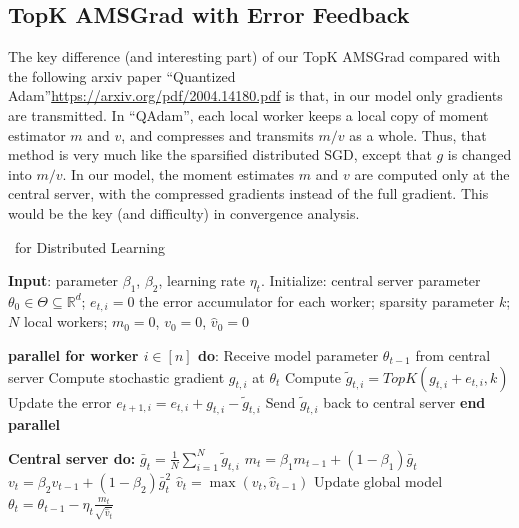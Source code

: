 \documentclass[11pt]{article}
\begin{document}
\subsection{TopK AMSGrad with Error Feedback}




The key difference (and interesting part) of our TopK AMSGrad compared with the following arxiv paper ``Quantized Adam''\url{https://arxiv.org/pdf/2004.14180.pdf} is that, in our model only gradients are transmitted. In ``QAdam'', each local worker keeps a local copy of moment estimator $m$ and $v$, and compresses and transmits $m/v$ as a whole. Thus, that method is very much like the sparsified distributed SGD, except that $g$ is changed into $m/v$. In our model, the moment estimates $m$ and $v$ are computed only at the central server, with the compressed gradients instead of the full gradient. This would be the key (and difficulty) in convergence analysis.


\begin{algorithm}[H]
\caption{\algo\ for Distributed Learning} \label{alg:sparsams}
\begin{algorithmic}[1]

\STATE \textbf{Input}: parameter $\beta_1$, $\beta_2$, learning rate $\eta_t$. 
\STATE Initialize: central server parameter $\theta_{0} \in \Theta \subseteq \mathbb R^d$; $e_{t,i}=0$ the error accumulator for each worker; sparsity parameter $k$; $N$ local workers; $m_0=0$, $v_0=0$, $\hat v_0=0$


\STATE\textbf{parallel for worker $i \in [n]$ do}:
\STATE\quad  Receive model parameter $\theta_{t-1}$ from central server
\STATE\quad  Compute stochastic gradient $g_{t,i}$ at $\theta_t$
\STATE\quad  Compute $\tilde g_{t,i}=TopK(g_{t,i}+e_{t,i},k)$ \label{line:topk}
\STATE\quad  Update the error $e_{t+1,i}=e_{t,i}+g_{t,i}-\tilde g_{t,i}$
\STATE\quad  Send $\tilde g_{t,i}$ back to central server
\STATE \textbf{end parallel}

\STATE \textbf{Central server do:}
\STATE $\bar g_{t}=\frac{1}{N}\sum_{i=1}^N \tilde g_{t,i}$
\STATE $m_t=\beta_1 m_{t-1}+(1-\beta_1)\bar g_t$
\STATE $v_t=\beta_2 v_{t-1}+(1-\beta_2)\bar g_t^2$
\STATE $\hat v_t=\max(v_t,\hat v_{t-1})$
\STATE Update global model $\theta_t=\theta_{t-1}-\eta_t\frac{m_t}{\sqrt{\hat v_t}}$

\ENDFOR
\end{algorithmic}
\end{algorithm}
\end{document}
